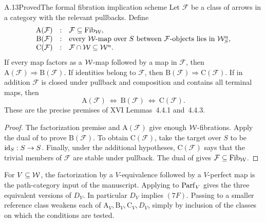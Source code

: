 \begin{claim}{A.13}{Proved}{The formal fibration implication scheme}
Let $\mathcal F$ be a class of arrows in a category with the relevant pullbacks. Define
\[
\begin{array}{rcl}
\mathrm A(\mathcal F)&:&\mathcal F\subseteq\operatorname{Fib}_{\mathcal{W}},\\
\mathrm B(\mathcal F)&:&\text{every }\mathcal{W}\text{-map over }S\text{ between }\mathcal F\text{-objects lies in }\mathcal{W}_S^u,\\
\mathrm C(\mathcal F)&:&\mathcal F\cap\mathcal{W}\subseteq\mathcal{W}^u.
\end{array}
\]
If every map factors as a $\mathcal{W}$-map followed by a map in $\mathcal F$, then $\mathrm A(\mathcal F)\Rightarrow\mathrm B(\mathcal F)$. If identities belong to $\mathcal F$, then $\mathrm B(\mathcal F)\Rightarrow\mathrm C(\mathcal F)$. If in addition $\mathcal F$ is closed under pullback and composition and contains all terminal maps, then
\[
\mathrm A(\mathcal F)\ \Longleftrightarrow\
\mathrm B(\mathcal F)\ \Longleftrightarrow\
\mathrm C(\mathcal F).
\]
These are the precise premises of XVI Lemmas~4.4.1 and~4.4.3.
\end{claim}
\begin{proof}
The factorization premise and $\mathrm A(\mathcal F)$ give enough $\mathcal{W}$-fibrations. Apply the dual of  to prove $\mathrm B(\mathcal F)$. To obtain $\mathrm C(\mathcal F)$, take the target over $S$ to be $\mathrm{id}_S:S\to S$. Finally, under the additional hypotheses, $\mathrm C(\mathcal F)$ says that the trivial members of $\mathcal F$ are stable under pullback. The dual of  gives $\mathcal F\subseteq\operatorname{Fib}_{\mathcal{W}}$.
\end{proof}
For $V\subseteq\mathcal{W}$, the factorization by a $V$-equivalence followed by a $V$-perfect map is the path-category input of the manuscript. Applying \claimref{A.13} to $\operatorname{Parf}_V$ gives the three equivalent versions of $D_V$. In particular $D_V$ implies $(7F)$. Passing to a smaller reference class weakens each of $\mathrm A_V,\mathrm B_V,\mathrm C_V,D_V$, simply by inclusion of the classes on which the conditions are tested.

